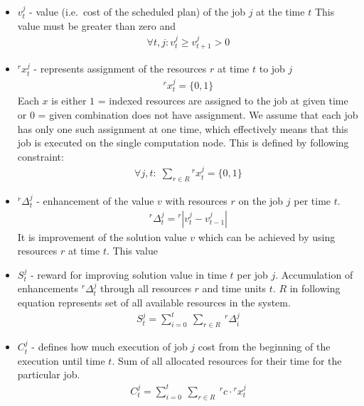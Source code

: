 \begin{itemize}
	\item $v_{t}^{j}$ - value (i.e.\ cost of the scheduled plan) of the job $j$ at the time $t$
	      This value must be greater than zero and 
	      \begin{align*}
	      	\forall t, j: v_{t}^{j} \geq v_{t+1}^{j} > 0 
	      \end{align*}
	\item $^{r}x_{t}^{j}$ - represents assignment of the resources $r$ at time $t$ to job $j$
	      \begin{align*}
	      	^{r}x_{t}^{j} = \{0, 1\} 
	      \end{align*}
	      Each $x$ is either $1$ = indexed resources are assigned to the job at given time or $0$ = given combination does not have assignment.
	      We assume that each job has only one such assignment at one time,
	      which effectively means that this job is executed on the single computation node.
	      This is defined by following constraint:
	      \begin{align*}
	      	\forall j, t:\; \sum_{r \in R} {}^{r}x_{t}^{j} = \{0, 1\} 
	      \end{align*}
	\item $^{r}\Delta_{t}^{j}$ - enhancement of the value $v$ with resources $r$ on the job $j$ per time $t$.
	      \begin{align*}
	      	^{r}\Delta_{t}^{j} = {}^{r}| v_{t}^{j} - v_{t-1}^{j}| 
	      \end{align*}
	      It is improvement of the solution value $v$ which can be achieved by using resources $r$ at time $t$.
	      This value 
	\item $S_{t}^{j}$ - reward for improving solution value in time $t$ per job $j$.
	      Accumulation of enhancements $^{r}\Delta_{t}^{j}$ through all resources $r$ and time units $t$.
	      $R$ in following equation represents set of all available resources in the system.
	      \begin{align*}
	      	S_{t}^{j} = \sum_{i = 0}^{t}\:\sum_{r \in R}\: {}^{r}\Delta_{i}^{j} 
	      \end{align*}
	\item $C_{t}^{j}$ - defines how much execution of job $j$ cost from the beginning of the execution until time $t$.
	      Sum of all allocated resources for their time for the particular job.
	      \begin{align*}
	      	C_{t}^{j} = \sum_{i = 0}^{t}\:\sum_{r \in R}\: {}^{r}c \cdot {}^{r}x_{t}^{j} 
	      \end{align*}
\end{itemize}

